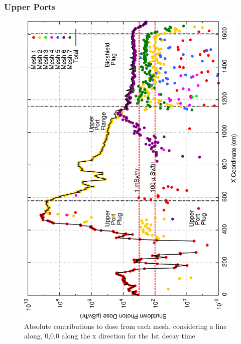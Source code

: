 \documentclass[12pt]{article}
\begin{document}
\subsubsection*{Upper Ports}
\begin{figure}[ht!]
\centering
\includegraphics[clip,scale=0.25]{../plots/crosstalk/nob4c/up/dc1.png}
\caption{Absolute contributions to dose from each mesh, considering a line along, 0,0,0 along the x direction for the 1st decay time}
\label{fig:ct_up_dc1}
\end{figure}
\end{document}
